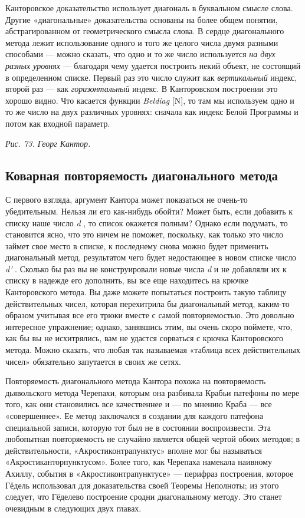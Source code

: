 \documentclass[../main.tex]{subfiles}
\begin{document}
Канторовское доказательство использует диагональ в буквальном смысле слова. Другие «диагональные» доказательства основаны на более общем понятии, абстрагированном от геометрического смысла слова. В сердце диагонального метода лежит использование одного и того же целого числа двумя разными способами --- можно сказать, что одно и то же число используется \emph{на двух разных уровнях} --- благодаря чему удается построить некий объект, не состоящий в определенном списке. Первый раз это число служит как \emph{вертикальный} индекс, второй раз --- как \emph{горизонтальный} индекс. В Канторовском построении это хорошо видно. Что касается функции \emph{Beldiag} {[}N{]}, то там мы используем одно и то же число на двух различных уровнях: сначала как индекс Белой Программы и потом как входной параметр.

\emph{Рис. 73. Георг Кантор.}


\subsection{Коварная повторяемость диагонального метода}

С первого взгляда, аргумент Кантора может показаться не очень-то убедительным. Нельзя ли его как-нибудь обойти? Может быть, если добавить к списку наше число \emph{d} , то список окажется полным? Однако если подумать, то становится ясно, что это ничем не поможет, поскольку, как только это число займет свое место в списке, к последнему снова можно будет применить диагональный метод, результатом чего будет недостающее в новом списке число \emph{d'} . Сколько бы раз вы не конструировали новые числа \emph{d} и не добавляли их к списку в надежде его дополнить, вы все еще находитесь на крючке Канторовского метода. Вы даже можете попытаться построить такую таблицу действительных чисел, которая перехитрила бы диагональный метод, каким-то образом учитывая все его трюки вместе с самой повторяемостью. Это довольно интересное упражнение; однако, занявшись этим, вы очень скоро поймете, что, как бы вы не исхитрялись, вам не удастся сорваться с крючка Канторовского метода. Можно сказать, что любая так называемая «таблица всех действительных чисел» обязательно запутается в своих же сетях.

Повторяемость диагонального метода Кантора похожа на повторяемость дьявольского метода Черепахи, которым она разбивала Крабьи патефоны по мере того, как они становились все качественнее и --- по мнению Краба --- все «совершеннее». Ее метод заключался в создании для каждого патефона специальной записи, которую тот был не в состоянии воспроизвести. Эта любопытная повторяемость не случайно является общей чертой обоих методов; в действительности, «Акростиконтрапунктус» вполне мог бы называться «Акростиканторпунктусом». Более того, как Черепаха намекала наивному Ахиллу, события в «Акростиконтрапунктусе» --- перифраз построения, которое Гёдель использовал для доказательства своей Теоремы Неполноты; из этого следует, что Гёделево построение сродни диагональному методу. Это станет очевидным в следующих двух главах.
\end{document}
